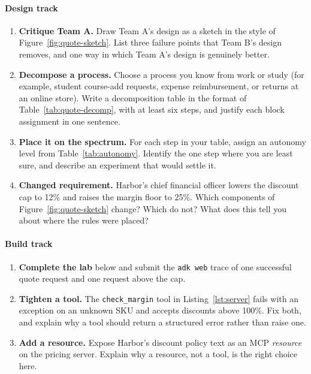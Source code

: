 \paragraph{Design track}
\begin{enumerate}[itemsep=2pt]
  \item \textbf{Critique Team A.} Draw Team A's design as a sketch in the style of Figure~\ref{fig:quote-sketch}. List three failure points that Team B's design removes, and one way in which Team A's design is genuinely better.
  \item \textbf{Decompose a process.} Choose a process you know from work or study (for example, student course-add requests, expense reimbursement, or returns at an online store). Write a decomposition table in the format of Table~\ref{tab:quote-decomp}, with at least six steps, and justify each block assignment in one sentence.
  \item \textbf{Place it on the spectrum.} For each step in your table, assign an autonomy level from Table~\ref{tab:autonomy}. Identify the one step where you are least sure, and describe an experiment that would settle it.
  \item \textbf{Changed requirement.} Harbor's chief financial officer lowers the discount cap to 12\% and raises the margin floor to 25\%. Which components of Figure~\ref{fig:quote-sketch} change? Which do not? What does this tell you about where the rules were placed?
\end{enumerate}

\paragraph{Build track}
\begin{enumerate}[resume, itemsep=2pt]
  \item \textbf{Complete the lab} below and submit the \texttt{adk web} trace of one successful quote request and one request above the cap.
  \item \textbf{Tighten a tool.} The \texttt{check\_margin} tool in Listing~\ref{lst:server} fails with an exception on an unknown SKU and accepts discounts above 100\%. Fix both, and explain why a tool should return a structured error rather than raise one.
  \item \textbf{Add a resource.} Expose Harbor's discount policy text as an MCP \emph{resource} on the pricing server. Explain why a resource, not a tool, is the right choice here.
\end{enumerate}

